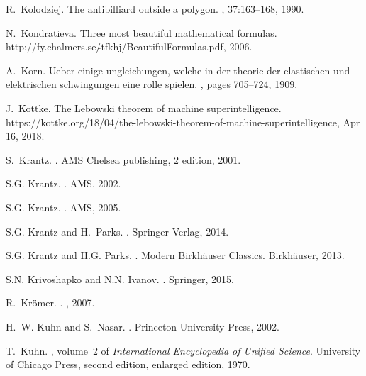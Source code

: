 \documentclass[12pt]{amsart}
\begin{document}
\begin{thebibliography}{100}
R.~Kolodziej.
\newblock The antibilliard outside a polygon.
, 37:163--168, 1990.

N.~Kondratieva.
\newblock Three most beautiful mathematical formulas.
\newblock {\\}http://fy.chalmers.se/$\tilde{}$tfkhj/BeautifulFormulas.pdf,
  2006.

A.~Korn.
\newblock Ueber einige ungleichungen, welche in der theorie der elastischen und
  elektrischen schwingungen eine rolle spielen.
,
  pages 705--724, 1909.

J.~Kottke.
\newblock The {L}ebowski theorem of machine superintelligence.
\newblock
  https://kottke.org/18/04/the-lebowski-theorem-of-machine-superintelligence,
  Apr 16, 2018.

S.~Krantz.
.
\newblock AMS Chelsea publishing, 2 edition, 2001.

S.G. Krantz.
.
\newblock AMS, 2002.

S.G. Krantz.
.
\newblock AMS, 2005.

S.G. Krantz and H.~Parks.
.
\newblock Springer Verlag, 2014.

S.G. Krantz and H.G. Parks.
.
\newblock Modern Birkh{\"a}user Classics. Birkh{\"a}user, 2013.

S.N. Krivoshapko and N.N. Ivanov.
.
\newblock Springer, 2015.

R.~{Kr\"omer}.
.
, 2007.

H.~W. Kuhn and S.~Nasar.
.
\newblock Princeton University Press, 2002.

T.~Kuhn.
, volume~2 of {\em
  International Encyclopedia of Unified Science}.
\newblock University of Chicago Press, second edition, enlarged edition, 1970.


\end{thebibliography}
\end{document}
